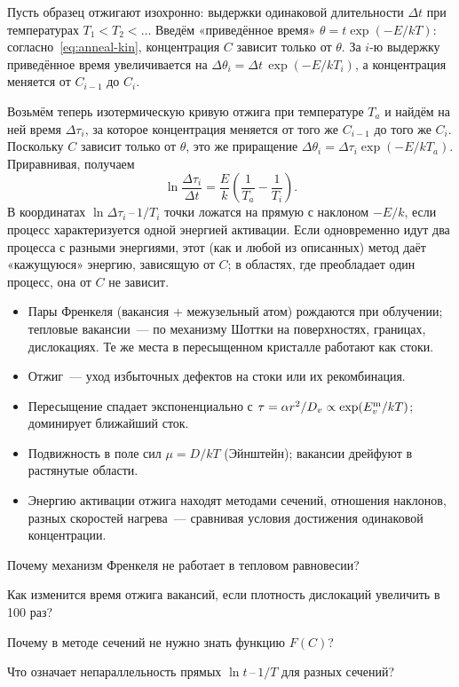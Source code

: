 \begin{podrobnee}
Пусть образец отжигают изохронно: выдержки одинаковой длительности
$\Delta t$ при температурах $T_1<T_2<\dots$ Введём «приведённое время»
$\theta=t\exp(-E/kT)$: согласно~\eqref{eq:anneal-kin}, концентрация $C$
зависит только от $\theta$. За $i$-ю выдержку приведённое время
увеличивается на $\Delta\theta_i=\Delta t\,\exp(-E/kT_i)$, а концентрация
меняется от $C_{i-1}$ до $C_i$.

Возьмём теперь изотермическую кривую отжига при температуре $T_a$ и
найдём на ней время $\Delta\tau_i$, за которое концентрация меняется
от того же $C_{i-1}$ до того же $C_i$. Поскольку $C$ зависит только от
$\theta$, это же приращение $\Delta\theta_i=\Delta\tau_i\exp(-E/kT_a)$.
Приравнивая, получаем
\[
\ln\frac{\Delta\tau_i}{\Delta t}=\frac{E}{k}\left(\frac{1}{T_a}-\frac{1}{T_i}\right).
\]
В координатах $\ln\Delta\tau_i$\,--\,$1/T_i$ точки ложатся на прямую с
наклоном $-E/k$, если процесс характеризуется одной энергией активации.
Если одновременно идут два процесса с разными энергиями, этот (как и любой
из описанных) метод даёт «кажущуюся» энергию, зависящую от $C$; в
областях, где преобладает один процесс, она от $C$ не зависит.
\end{podrobnee}

\begin{itogi}
\begin{itemize}
\item Пары Френкеля (вакансия + межузельный атом) рождаются при облучении;
тепловые вакансии~— по механизму Шоттки на поверхностях, границах,
дислокациях. Те же места в пересыщенном кристалле работают как стоки.
\item Отжиг~— уход избыточных дефектов на стоки или их рекомбинация.
\item Пересыщение спадает экспоненциально с $\tau=\alpha r^2/D_v\propto
\exp(E_{v}^{\mathrm{m}}/kT)$; доминирует ближайший сток.
\item Подвижность в поле сил $\mu=D/kT$ (Эйнштейн); вакансии дрейфуют в
растянутые области.
\item Энергию активации отжига находят методами сечений, отношения
наклонов, разных скоростей нагрева~— сравнивая условия достижения
одинаковой концентрации.
\end{itemize}
\end{itogi}

\begin{proverka}
\item Почему механизм Френкеля не работает в тепловом равновесии?
\item Как изменится время отжига вакансий, если плотность дислокаций
увеличить в 100 раз?
\item Почему в методе сечений не нужно знать функцию $F(C)$?
\item Что означает непараллельность прямых $\ln t$\,--\,$1/T$ для разных
сечений?
\end{proverka}
